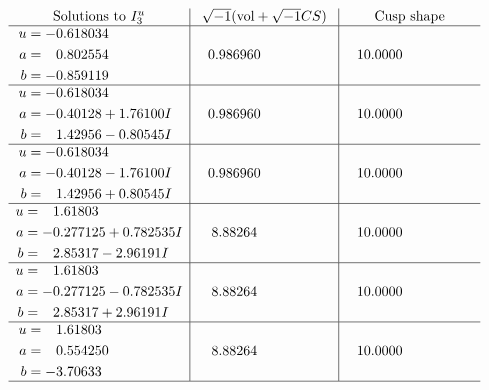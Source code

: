 \documentclass[1p]{elsarticle_modified}
\theoremstyle{definition}
\newcommand{\I}{\sqrt{-1}}
\begin{document}
$$\begin{array}{c|c|c}  
\text{Solutions to }I^u_{3}& \I (\text{vol} + \sqrt{-1}CS) & \text{Cusp shape}\\
 \hline 
\begin{aligned}
u &= -0.618034\phantom{ +0.000000I} \\
a &= \phantom{-}0.802554\phantom{ +0.000000I} \\
b &= -0.859119\phantom{ +0.000000I}\end{aligned}
 & \phantom{-}0.986960\phantom{ +0.000000I} & \phantom{-}10.0000\phantom{ +0.000000I} \\ \hline\begin{aligned}
u &= -0.618034\phantom{ +0.000000I} \\
a &= -0.40128 + 1.76100 I \\
b &= \phantom{-}1.42956 - 0.80545 I\end{aligned}
 & \phantom{-}0.986960\phantom{ +0.000000I} & \phantom{-}10.0000\phantom{ +0.000000I} \\ \hline\begin{aligned}
u &= -0.618034\phantom{ +0.000000I} \\
a &= -0.40128 - 1.76100 I \\
b &= \phantom{-}1.42956 + 0.80545 I\end{aligned}
 & \phantom{-}0.986960\phantom{ +0.000000I} & \phantom{-}10.0000\phantom{ +0.000000I} \\ \hline\begin{aligned}
u &= \phantom{-}1.61803\phantom{ +0.000000I} \\
a &= -0.277125 + 0.782535 I \\
b &= \phantom{-}2.85317 - 2.96191 I\end{aligned}
 & \phantom{-}8.88264\phantom{ +0.000000I} & \phantom{-}10.0000\phantom{ +0.000000I} \\ \hline\begin{aligned}
u &= \phantom{-}1.61803\phantom{ +0.000000I} \\
a &= -0.277125 - 0.782535 I \\
b &= \phantom{-}2.85317 + 2.96191 I\end{aligned}
 & \phantom{-}8.88264\phantom{ +0.000000I} & \phantom{-}10.0000\phantom{ +0.000000I} \\ \hline\begin{aligned}
u &= \phantom{-}1.61803\phantom{ +0.000000I} \\
a &= \phantom{-}0.554250\phantom{ +0.000000I} \\
b &= -3.70633\phantom{ +0.000000I}\end{aligned}
 & \phantom{-}8.88264\phantom{ +0.000000I} & \phantom{-}10.0000\phantom{ +0.000000I}\\
 \hline 
 \end{array}$$\newpage
\end{document}

